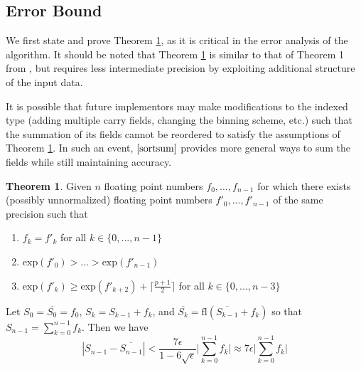 \documentclass[12pt]{article}
\providecommand{\exp}{\ensuremath{\text{exp}}}
\providecommand{\fl}{\ensuremath{\text{fl}}}
\theoremstyle{definition}
\newtheorem{thm}{Theorem}[section]
\numberwithin{equation}{section}
\numberwithin{figure}{section}
\begin{document}
  \subsection{Error Bound}
    \label{sec:primitiveops_error}

    We first state and prove Theorem \ref{thm:mysortsum}, as it is critical in the error analysis of the algorithm. It should be noted that Theorem \ref{thm:mysortsum} is similar to that of Theorem 1 from \cite{sortsum}, but requires less intermediate precision by exploiting additional structure of the input data.

    It is possible that future implementors may make modifications to the indexed type (adding multiple carry fields, changing the binning scheme, etc.) such that the summation of its fields cannot be reordered to satisfy the assumptions of Theorem \ref{thm:mysortsum}. In such an event, $\cite{sortsum}$ provides more general ways to sum the fields while still maintaining accuracy.
      \begin{samepage}
    \begin{thm}
      Given $n$ floating point numbers $f_0, ..., f_{n - 1}$ for which there exists (possibly unnormalized) floating point numbers $f'_0, ..., f'_{n - 1}$ of the same precision such that
      \begin{enumerate}
        \item $f_k = f'_k$ for all $k \in \{0, ..., n - 1\}$
        \item $\exp(f'_0) > ... > \exp(f'_{n - 1})$
        \item $\exp(f'_k) \geq \exp(f'_{k + 2}) + \lceil\frac{p + 1}{2}\rceil$ for all $k \in \{0, ..., n - 3\}$
      \end{enumerate}
      \label{thm:mysortsum}
      Let $S_0 = \overline{S_0} = f_0$, $S_k = S_{k - 1} + f_k$, and $\overline{S_k} = \fl(\overline{S_{k - 1}} + f_k)$ so that $S_{n - 1} = \sum \limits_{k = 0}^{n - 1} f_k$.
      Then we have
      \begin{equation*}
        \left|S_{n - 1} - \overline{S_{n - 1}}\right| < \frac{7\epsilon}{1 - 6\sqrt\epsilon}\bigl|\sum\limits_{k = 0}^{n - 1}f_k\bigr| \approx 7 \epsilon \bigl|\sum\limits_{k = 0}^{n - 1}f_k\bigr|
      \end{equation*}
    \end{thm}
    \end{samepage}
\end{document}
